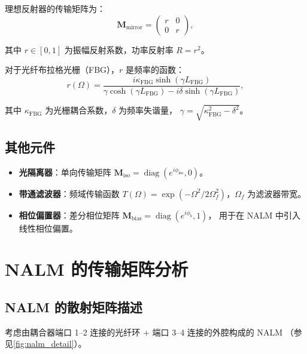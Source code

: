 \documentclass[11pt,a4paper]{ctexart}
\begin{document}
理想反射器的传输矩阵为：
\begin{equation}
  \mathbf{M}_{\text{mirror}} =
  \begin{pmatrix}
    r & 0 \\
    0 & r
  \end{pmatrix},
  \label{eq:M_mirror}
\end{equation}

其中 $r \in [0,1]$ 为振幅反射系数，功率反射率 $R = r^2$。

对于光纤布拉格光栅（FBG），$r$ 是频率的函数：
\begin{equation}
  r(\Omega) = \frac{i\kappa_{\text{FBG}} \sinh(\gamma L_{\text{FBG}})}
                    {\gamma \cosh(\gamma L_{\text{FBG}}) - i\delta \sinh(\gamma L_{\text{FBG}})},
  \label{eq:r_FBG}
\end{equation}

其中 $\kappa_{\text{FBG}}$ 为光栅耦合系数，$\delta$ 为频率失谐量，
$\gamma = \sqrt{\kappa_{\text{FBG}}^2 - \delta^2}$。

\subsection{其他元件}

\begin{itemize}
  \item \textbf{光隔离器}：单向传输矩阵
        $\mathbf{M}_{\text{iso}} = \operatorname{diag}(e^{i\phi_{\text{iso}}}, 0)$。
  \item \textbf{带通滤波器}：频域传输函数
        $T(\Omega) = \exp(-\Omega^2 / 2\Omega_f^2)$，$\Omega_f$ 为滤波器带宽。
  \item \textbf{相位偏置器}：差分相位矩阵
        $\mathbf{M}_{\text{bias}} = \operatorname{diag}(e^{i\phi_b}, 1)$，
        用于在 NALM 中引入线性相位偏置。
\end{itemize}

\section{NALM 的传输矩阵分析}
\label{sec:nalm}

\subsection{NALM 的散射矩阵描述}

考虑由耦合器端口 1--2 连接的光纤环 + 端口 3--4 连接的外腔构成的 NALM
（参见\cref{fig:nalm_detail}）。
\end{document}
